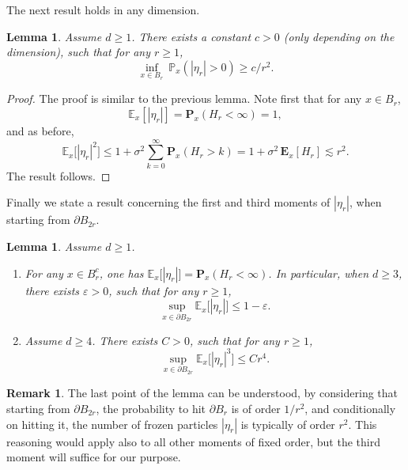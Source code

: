 \documentclass[11pt]{article}
\numberwithin{equation}{section}
\theoremstyle{plain}
\newtheorem{lemma}[theorem]{Lemma}
\theoremstyle{definition}
\newtheorem{remark}[theorem]{Remark}
\newcommand{\1}{{\text{\Large $\mathfrak 1$}}}
\begin{document}
The next result holds in any dimension.
\begin{lemma}\label{lem.hit.inside}
Assume $d\ge 1$. There exists a constant $c>0$ (only depending on the dimension), such that for any $r\ge 1$,
\[
\inf_{x\in B_r} \ \mathbb P_x(|\eta_r|>0) \ge c/r^2.
\]
\end{lemma}
\begin{proof}
The proof is similar to the previous lemma.
Note first that for any $x\in B_r$,
\[
\mathbb E_x[|\eta_r|] = \mathbf P_x(H_r<\infty) = 1,
\]
and as before,
\[
\mathbb E_x\big[|\eta_r|^2\big] \le 1 + \sigma^2\sum_{k=0}^\infty \mathbf P_x(H_r>k) = 1+ \sigma^2\, \mathbf E_x[H_r] \lesssim r^2.
\]
The result follows.
\end{proof}

Finally we state a result concerning the first and third moments
of $|\eta_r|$, when starting from $\partial B_{2r}$.
\begin{lemma}\label{lem.mom.etar}
Assume $d\ge 1$.
\begin{enumerate}
\item For any $x\in B_r^c$,
one has $\mathbb E_x\big[|\eta_r|\big] = \mathbf P_x(H_r<\infty)$.
In particular, when $d\ge 3$, there exists
$\varepsilon>0$, such that for any $r\ge 1$,
\[
\sup_{x\in \partial B_{2r}} \mathbb E_x\big[|\eta_r|\big]
\le 1-\varepsilon.
\]
\item Assume $d\ge 4$. There exists $C>0$, such that for any $r\ge 1$,
\[
\sup_{x\in \partial B_{2r}} \mathbb E_x\big[|\eta_r|^3\big] \le Cr^4.
\]
\end{enumerate}
\end{lemma}
\begin{remark}
The last point of the lemma can be understood, by considering that starting from $\partial B_{2r}$, the probability to hit $\partial B_r$ is of order $1/r^2$, and conditionally on hitting it, the number of frozen particles $|\eta_r|$ is typically of order $r^2$. This reasoning would apply also
to all other moments of fixed order, but the third moment will suffice for our purpose.
\end{remark}
\end{document}
